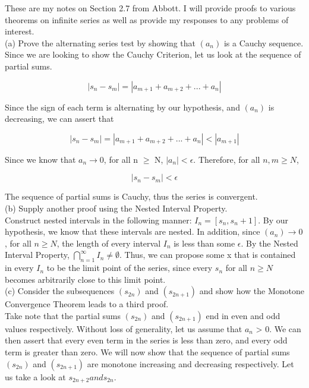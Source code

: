 \documentclass{article}
\begin{document}
These are my notes on Section 2.7 from Abbott. I will provide proofs to various theorems on infinite series as well as provide my responses to any problems of interest. \\

(a) Prove the alternating series test by showing that $(a_n)$ is a Cauchy sequence. \\

Since we are looking to show the Cauchy Criterion, let us look at the sequence of partial sums. 

\begin{equation}
    |s_n - s_m| = |a_{m+1} + a_{m+2} + ... + a_n|
\end{equation}

Since the sign of each term is alternating by our hypothesis, and $(a_n)$ is decreasing, we can assert that 

\begin{equation}
    |s_n - s_m| = |a_{m+1} + a_{m+2} + ... + a_n| < |a_{m+1}|
\end{equation}

Since we know that $a_n \rightarrow 0$, for all n $\ge$ N, $|a_n| < \epsilon$. Therefore, for all $n, m \ge N$,

\begin{equation}
    |s_n - s_m| < \epsilon
\end{equation}

The sequence of partial sums is Cauchy, thus the series is convergent. \\

(b) Supply another proof using the Nested Interval Property. \\

Construct nested intervals in the following manner: $I_n = [s_n, s_n+1]$. By our hypothesis, we know that these intervals are nested. In addition, since $(a_n) \rightarrow 0$, for all $n \ge N$, the length of every interval $I_n$ is less than some $\epsilon$. By the Nested Interval Property, ${\bigcap}_{n=1}^\infty I_n \neq \emptyset$. Thus, we can propose some x that is contained in every $I_n$ to be the limit point of the series, since every $s_n$ for all $n \ge N$ becomes arbitrarily close to this limit point. \\

(c) Consider the subsequences $(s_{2n})$ and $(s_{2n+1})$ and show how the Monotone Convergence Theorem leads to a third proof. \\

Take note that the partial sums $(s_{2n})$ and $(s_{2n+1})$ end in even and odd values respectively. Without loss of generality, let us assume that $a_n$ > 0. We can then assert that every even term in the series is less than zero, and every odd term is greater than zero. We will now show that the sequence of partial sums $(s_{2n})$ and $(s_{2n+1})$ are monotone increasing and decreasing respectively. Let us take a look at $s_{2n+2} and s_{2n}$. 
\end{document}
